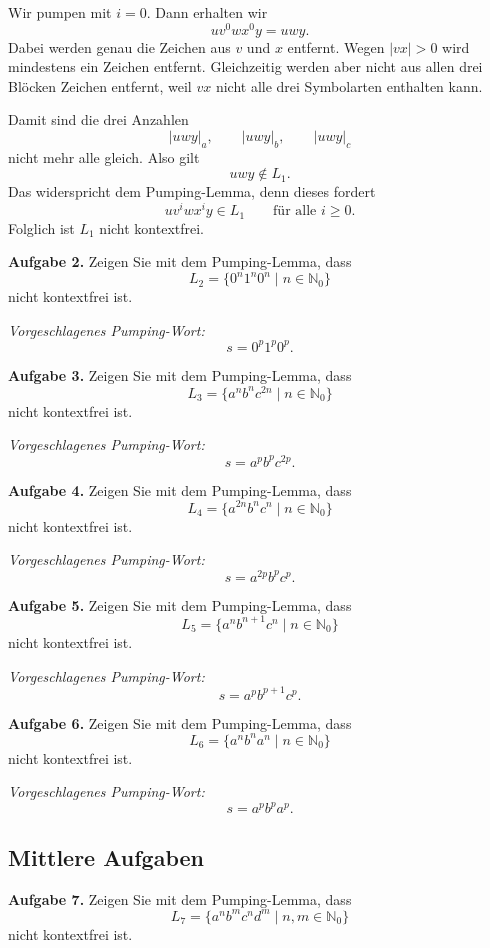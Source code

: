 \documentclass[a4paper,12pt]{article}
\begin{document}
\medskip
Wir pumpen mit $i=0$. Dann erhalten wir
\[
    uv^0wx^0y=uwy.
\]
Dabei werden genau die Zeichen aus $v$ und $x$ entfernt. Wegen $|vx|>0$ wird mindestens
ein Zeichen entfernt. Gleichzeitig werden aber nicht aus allen drei Blöcken Zeichen entfernt,
weil $vx$ nicht alle drei Symbolarten enthalten kann.

\medskip
Damit sind die drei Anzahlen
\[
    |uwy|_a,\qquad |uwy|_b,\qquad |uwy|_c
\]
nicht mehr alle gleich. Also gilt
\[
    uwy\notin L_1.
\]
Das widerspricht dem Pumping-Lemma, denn dieses fordert
\[
    uv^iwx^iy\in L_1
    \qquad\text{für alle } i\ge 0.
\]
Folglich ist $L_1$ nicht kontextfrei.

\medskip
\textbf{Aufgabe 2.}
Zeigen Sie mit dem Pumping-Lemma, dass
\[
    L_2=\{0^n1^n0^n\mid n\in\mathbb{N}_0\}
\]
nicht kontextfrei ist.

\medskip
\textit{Vorgeschlagenes Pumping-Wort:}
\[
    s=0^p1^p0^p.
\]

\medskip
\textbf{Aufgabe 3.}
Zeigen Sie mit dem Pumping-Lemma, dass
\[
    L_3=\{a^n b^n c^{2n}\mid n\in\mathbb{N}_0\}
\]
nicht kontextfrei ist.

\medskip
\textit{Vorgeschlagenes Pumping-Wort:}
\[
    s=a^p b^p c^{2p}.
\]

\medskip
\textbf{Aufgabe 4.}
Zeigen Sie mit dem Pumping-Lemma, dass
\[
    L_4=\{a^{2n}b^n c^n\mid n\in\mathbb{N}_0\}
\]
nicht kontextfrei ist.

\medskip
\textit{Vorgeschlagenes Pumping-Wort:}
\[
    s=a^{2p}b^p c^p.
\]

\medskip
\textbf{Aufgabe 5.}
Zeigen Sie mit dem Pumping-Lemma, dass
\[
    L_5=\{a^n b^{n+1} c^n\mid n\in\mathbb{N}_0\}
\]
nicht kontextfrei ist.

\medskip
\textit{Vorgeschlagenes Pumping-Wort:}
\[
    s=a^p b^{p+1} c^p.
\]

\medskip
\textbf{Aufgabe 6.}
Zeigen Sie mit dem Pumping-Lemma, dass
\[
    L_6=\{a^n b^n a^n\mid n\in\mathbb{N}_0\}
\]
nicht kontextfrei ist.

\medskip
\textit{Vorgeschlagenes Pumping-Wort:}
\[
    s=a^p b^p a^p.
\]

\newpage
\subsection*{Mittlere Aufgaben}

\textbf{Aufgabe 7.}
Zeigen Sie mit dem Pumping-Lemma, dass
\[
    L_7=\{a^n b^m c^n d^m\mid n,m\in\mathbb{N}_0\}
\]
nicht kontextfrei ist.
\end{document}
